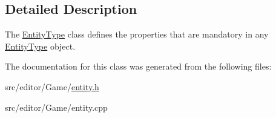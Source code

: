 \subsection{\-Detailed \-Description}
\-The \hyperlink{class_entity_type}{\-Entity\-Type} class defines the properties that are mandatory in any \hyperlink{class_entity_type}{\-Entity\-Type} object. 

\-The documentation for this class was generated from the following files\-:\begin{DoxyCompactItemize}
\item 
src/editor/\-Game/\hyperlink{entity_8h}{entity.\-h}\item 
src/editor/\-Game/entity.\-cpp\end{DoxyCompactItemize}
